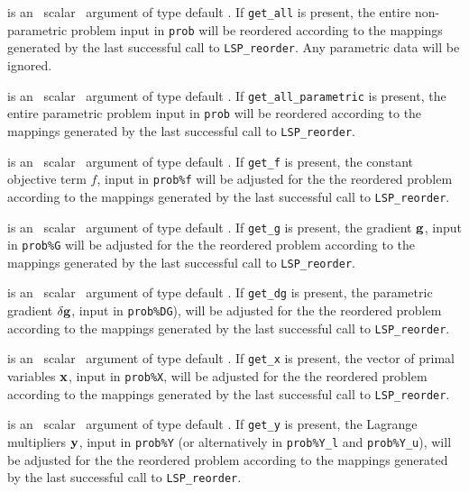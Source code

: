 \documentclass{galahad}
\newcommand{\packagename}{LSP}
\begin{document}
\begin{description}
is an \optional\ scalar \intentin\ argument of type default \logical. 
If {\tt get\_all} is present, the entire non-parametric problem 
input in {\tt prob} will be reordered according to the 
mappings generated by the last successful call to {\tt \packagename\_reorder}. 
Any parametric data will be ignored.

is an \optional\ scalar \intentin\ argument of type default \logical. 
If {\tt get\_all\_parametric} is present, the entire parametric problem 
input in {\tt prob} will be reordered according to the 
mappings generated by the last successful call to {\tt \packagename\_reorder}. 
 
is an \optional\ scalar \intentin\ argument of type default \logical. 
If {\tt get\_f} is present, the constant objective term
$f$, input in {\tt prob\%f} 
will be adjusted for the the reordered problem according to the 
mappings generated by the last successful call to {\tt \packagename\_reorder}. 
 
is an \optional\ scalar \intentin\ argument of type default \logical. 
If {\tt get\_g} is present, the gradient 
${\mathbf{g}}$, input in {\tt prob\%G} 
will be adjusted for the the reordered problem according to the 
mappings generated by the last successful call to {\tt \packagename\_reorder}. 
 
is an \optional\ scalar \intentin\ argument of type default \logical. 
If {\tt get\_dg} is present, the parametric gradient $\delta {\mathbf{g}}$, input in 
{\tt prob\%DG}),
will be adjusted for the the reordered problem according to the 
mappings generated by the last successful call to {\tt \packagename\_reorder}. 
 
is an \optional\ scalar \intentin\ argument of type default \logical. 
If {\tt get\_x} is present, the vector of primal variables ${\mathbf{x}}$, 
input in {\tt prob\%X}, will be 
adjusted for the the reordered problem according to the 
mappings generated by the last successful call to {\tt \packagename\_reorder}. 
 
is an \optional\ scalar \intentin\ argument of type default \logical. 
If {\tt get\_y} is present, the 
Lagrange multipliers ${\mathbf{y}}$, input in {\tt prob\%Y}
(or alternatively in {\tt prob\%Y\_l} and {\tt prob\%Y\_u}), 
will be adjusted for the the reordered problem according to the 
mappings generated by the last successful call to {\tt \packagename\_reorder}. 


\end{description}
\end{document}
